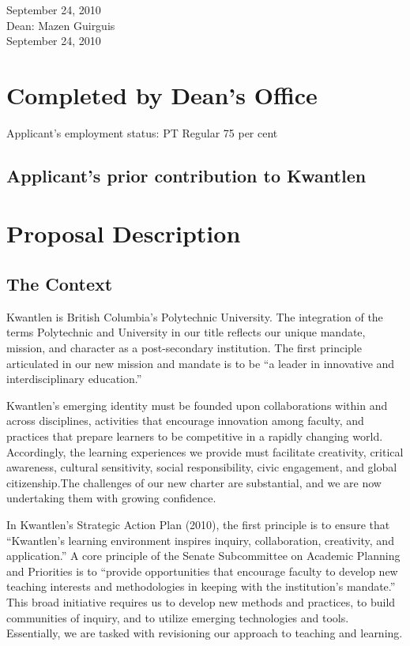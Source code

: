 \documentclass[10pt, letterpaper]{article}
\begin{document}
September 24, 2010\\

\noindent Dean: Mazen Guirguis\\


September 24, 2010


\section*{Completed by Dean's Office}

Applicant's employment status: PT Regular 75 per cent\\

\subsection*{Applicant's prior contribution to Kwantlen}
\newpage
\section*{Proposal Description}

\subsection*{The Context}

Kwantlen is British Columbia’s Polytechnic University. The integration of the terms Polytechnic and University in our title reflects our unique mandate, mission, and character as a post-secondary institution. The first principle articulated in our new mission and mandate is to be ``a leader in innovative and interdisciplinary education.''

Kwantlen’s emerging identity must be founded upon collaborations within and across disciplines, activities that encourage innovation among faculty, and practices that prepare learners to be competitive in a rapidly changing world. Accordingly, the learning experiences we provide must facilitate creativity, critical awareness, cultural sensitivity, social responsibility, civic engagement, and global citizenship.The challenges of our new charter are substantial, and we are now undertaking them with growing confidence.

In Kwantlen's Strategic Action Plan (2010), the first principle is to ensure that ``Kwantlen’s learning environment inspires inquiry, collaboration, creativity, and application.'' A core principle of the Senate Subcommittee on Academic Planning and Priorities is to ``provide opportunities that encourage faculty to develop new teaching interests and methodologies in keeping with the institution's mandate.'' This broad initiative requires us to develop new methods and practices, to build communities of inquiry, and to utilize emerging technologies and tools. Essentially, we are tasked with revisioning our approach to teaching and learning.
\end{document}
